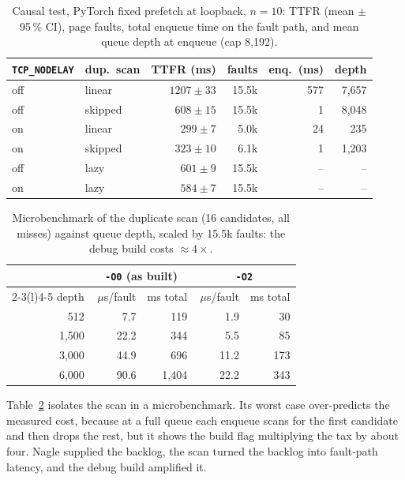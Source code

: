 \documentclass[conference]{IEEEtran}
\newcommand{\nd}{\texttt{TCP\_NODELAY}\xspace}
\newcommand{\us}{\,$\mu$s\xspace}
\begin{document}
\begin{table}[t]
\centering
\caption{Causal test, PyTorch fixed prefetch at loopback, $n\!=\!10$:
TTFR (mean $\pm$ 95\,\% CI), page faults, total enqueue time on the fault
path, and mean queue depth at enqueue (cap 8{,}192).}
\label{tab:ablate}
\small
\setlength{\tabcolsep}{4pt}
\begin{tabular}{@{}llrrrr@{}}
\toprule
\nd & dup.\ scan & TTFR (ms) & faults & enq.\ (ms) & depth \\
\midrule
off & linear  & $1207\pm33$ & 15.5k & 577 & 7{,}657 \\
off & skipped & $608\pm15$  & 15.5k & 1   & 8{,}048 \\
on  & linear  & $299\pm7$   & 5.0k  & 24  & 235 \\
on  & skipped & $323\pm10$  & 6.1k  & 1   & 1{,}203 \\
\midrule
off & lazy    & $601\pm9$   & 15.5k & --  & -- \\
on  & lazy    & $584\pm7$   & 15.5k & --  & -- \\
\bottomrule
\end{tabular}
\end{table}

\begin{table}[t]
\centering
\caption{Microbenchmark of the duplicate scan (16 candidates, all misses)
against queue depth, scaled by 15.5k faults: the debug build costs
${\approx}4\times$.}
\label{tab:scan}
\small
\begin{tabular}{@{}rrrrr@{}}
\toprule
& \multicolumn{2}{c}{\texttt{-O0} (as built)} & \multicolumn{2}{c}{\texttt{-O2}} \\
\cmidrule(lr){2-3}\cmidrule(l){4-5}
depth & \us/fault & ms total & \us/fault & ms total \\
\midrule
512   & 7.7   & 119   & 1.9  & 30  \\
1{,}500 & 22.2 & 344  & 5.5  & 85  \\
3{,}000 & 44.9 & 696  & 11.2 & 173 \\
6{,}000 & 90.6 & 1{,}404 & 22.2 & 343 \\
\bottomrule
\end{tabular}
\end{table}

Table~\ref{tab:scan} isolates the scan in a microbenchmark. Its worst case
over-predicts the measured cost, because at a full queue each enqueue scans
for the first candidate and then drops the rest, but it shows the build flag
multiplying the tax by about four. Nagle supplied the backlog, the scan turned
the backlog into fault-path latency, and the debug build amplified it.
\end{document}
